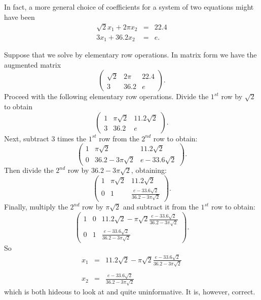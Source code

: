 \documentclass{ximera}
\begin{document}
In fact, a more general choice of coefficients for a system of
two equations might have been
\begin{eqnarray}
\sqrt{2}x_1 + 2\pi x_2 & = & 22.4  \nonumber \\
3x_1+36.2 x_2 & = & e. \label{e:irrat}
\end{eqnarray}   

Suppose that we solve  by elementary row
operations.  In  matrix form we have the augmented matrix
\[
\left(\begin{array}{cc|c} \sqrt{2} & 2\pi & 22.4\\
3 & 36.2 & e\end{array}\right).
\]
Proceed with the following elementary row operations. Divide the
$1^{st}$ row by $\sqrt{2}$ to obtain
\[
\left(\begin{array}{cc|c} 1 & \pi\sqrt{2} & 11.2\sqrt{2}\\
3 & 36.2 & e\end{array}\right).
\]
Next, subtract $3$ times the $1^{st}$ row from the $2^{nd}$ row
to obtain:
\[
\left(\begin{array}{cc|c} 1 & \pi\sqrt{2} & 11.2\sqrt{2}\\
0 & 36.2- 3\pi\sqrt{2} & e- 33.6\sqrt{2}\end{array}\right).
\]
Then divide the $2^{nd}$ row by $36.2-3\pi\sqrt{2}$,
obtaining:
\[
\left(\begin{array}{cc|c} 1 & \pi\sqrt{2} & 11.2\sqrt{2}\\
0 & 1 & \frac{e-33.6\sqrt{2}}{36.2-3\pi\sqrt{2}}\end{array}\right).
\]
Finally, multiply the $2^{nd}$ row by $\pi\sqrt{2}$ and
subtract it from the $1^{st}$ row to obtain:
\[
\left(\begin{array}{cc|c} 1 & 0 &
11.2\sqrt{2}-\pi\sqrt{2}\frac{e-33.6\sqrt{2}}{36.2-3\pi\sqrt{2}} \\
0 & 1 & \frac{e-33.6\sqrt{2}}{36.2-3\pi\sqrt{2}}\end{array}\right).
\]
So
\begin{eqnarray}
x_1 & = &  11.2\sqrt{2}-\pi\sqrt{2}\frac{e-33.6\sqrt{2}}{36.2-3\pi\sqrt{2}}
\nonumber
\\
  &  &   \label{e:irratans} \\
x_2 & = & \frac{e-33.6\sqrt{2}}{36.2-3\pi\sqrt{2}} \nonumber
\end{eqnarray}
which is both hideous to look at and quite uninformative.  It is,
however, correct.
\end{document}
